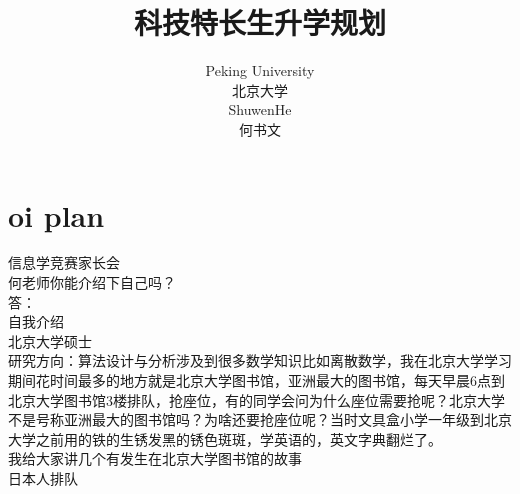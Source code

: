 \documentclass[12pt,twiside,a4paper]{ctexbook}
\numberwithin{chapter}{part}
\begin{document}

\author
{
Peking University\\
北京大学\\
ShuwenHe\\
何书文
}

\title{科技特长生升学规划}
\maketitle
\tableofcontents
\pagestyle{fancy}


\chapter{oi plan}
信息学竞赛家长会\\
何老师你能介绍下自己吗？\\
答：\\
自我介绍\\
北京大学硕士\\
研究方向：算法设计与分析涉及到很多数学知识比如离散数学，我在北京大学学习期间花时间最多的地方就是北京大学图书馆，亚洲最大的图书馆，每天早晨6点到北京大学图书馆3楼排队，抢座位，有的同学会问为什么座位需要抢呢？北京大学不是号称亚洲最大的图书馆吗？为啥还要抢座位呢？当时文具盒小学一年级到北京大学之前用的铁的生锈发黑的锈色斑斑，学英语的，英文字典翻烂了。\\
我给大家讲几个有发生在北京大学图书馆的故事\\
日本人排队\\
\end{document}
